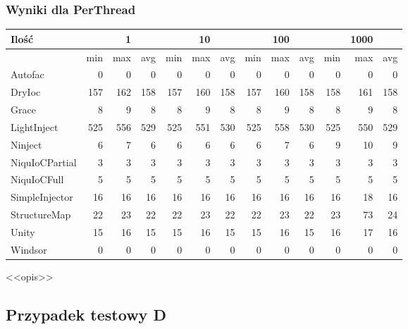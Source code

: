 \documentclass[12pt]{article}
\begin{document}
\subsubsection{Wyniki dla PerThread}
\begin{center}
\begin{small}
	\begin{tabular}{ | l | r r r | r r r | r r r | r r r | }
    		\hline
Ilość & & 1 & & & 10 & & & 100 & & & 1000 & \\ \hline
 & min & max & avg & min & max & avg & min & max & avg & min & max & avg \\ \hline
Autofac & 0 & 0 & 0 & 0 & 0 & 0 & 0 & 0 & 0 & 0 & 0 & 0 \\ \hline
DryIoc & 157 & 162 & 158 & 157 & 160 & 158 & 157 & 160 & 158 & 158 & 161 & 158 \\ \hline
Grace & 8 & 9 & 8 & 8 & 9 & 8 & 8 & 9 & 8 & 8 & 9 & 8 \\ \hline
LightInject & 525 & 556 & 529 & 525 & 551 & 530 & 525 & 558 & 530 & 525 & 550 & 529 \\ \hline
Ninject & 6 & 7 & 6 & 6 & 6 & 6 & 6 & 7 & 6 & 9 & 10 & 9 \\ \hline
NiquIoCPartial & 3 & 3 & 3 & 3 & 3 & 3 & 3 & 3 & 3 & 3 & 3 & 3 \\ \hline
NiquIoCFull & 5 & 5 & 5 & 5 & 5 & 5 & 5 & 5 & 5 & 5 & 5 & 5 \\ \hline
SimpleInjector & 16 & 16 & 16 & 16 & 16 & 16 & 16 & 16 & 16 & 16 & 18 & 16 \\ \hline
StructureMap & 22 & 23 & 22 & 22 & 23 & 22 & 22 & 23 & 22 & 23 & 73 & 24 \\ \hline
Unity & 15 & 16 & 15 & 15 & 16 & 15 & 15 & 16 & 15 & 16 & 17 & 16 \\ \hline
Windsor & 0 & 0 & 0 & 0 & 0 & 0 & 0 & 0 & 0 & 0 & 0 & 0 \\ \hline
  	\end{tabular}
\end{small}
\end{center}
<<opis>>


\subsection{Przypadek testowy D}
\end{document}
